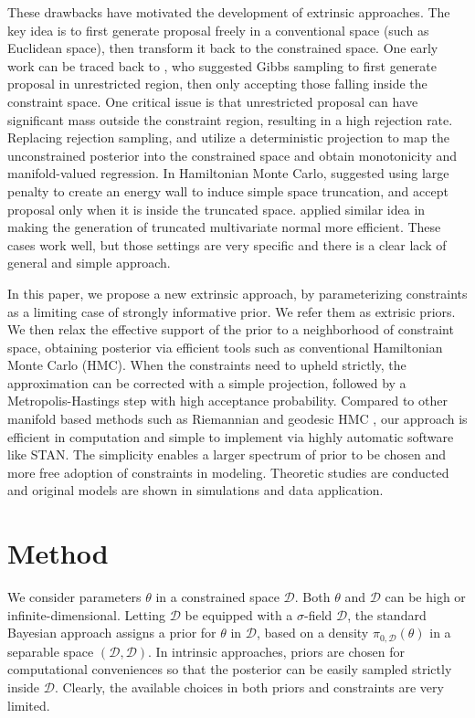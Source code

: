 \documentclass[10pt]{article}
\newcommand{\mc}[1]{\mathcal{#1}}
\DeclareMathOperator{\1}{\mathbbm{1}}
\begin{document}
These drawbacks have motivated the development of extrinsic approaches. The key idea is to first generate proposal freely in a conventional space (such as Euclidean space), then transform it back to the constrained space. One early work can be traced back to \cite{gelfand1992bayesian}, who suggested Gibbs sampling to first generate proposal in unrestricted region, then only accepting those falling inside the constraint space. One critical issue is that unrestricted proposal can have significant mass outside the constraint region, resulting in a high rejection rate. Replacing rejection sampling, \cite{lin2014monogp} and \cite{lin2016extrinsic} utilize a deterministic projection to map the unconstrained posterior into the constrained space and obtain monotonicity and manifold-valued regression. In Hamiltonian Monte Carlo, \cite{neal2011mcmc} suggested using large penalty to create an energy wall to induce simple space truncation, and accept proposal only when it is inside the truncated space. \cite{pakman2014exact} applied similar idea in making the generation of truncated multivariate normal more efficient. These cases work well, but those settings are very specific and there is a clear lack of general and simple approach. 

In this paper, we propose a new extrinsic approach, by parameterizing constraints as a limiting case of strongly informative prior. We refer them as extrisic priors. We then relax the effective support of the prior to a neighborhood of constraint space, obtaining posterior via efficient tools such as conventional Hamiltonian Monte Carlo (HMC). When the constraints need to upheld strictly, the approximation can be corrected with a simple projection, followed by a Metropolis-Hastings step with high acceptance probability. Compared to other manifold based methods such as Riemannian and geodesic HMC \citep{girolami2011riemann,byrne2013geodesic}, our approach is efficient in computation and simple to implement via highly automatic software like STAN. The simplicity enables a larger spectrum of prior to be chosen and more free adoption of constraints in modeling. Theoretic studies are conducted and original models are shown in simulations and data application.

\section{Method}

We consider parameters $\theta$ in a constrained space $\mc D$. Both $\theta$ and $\mc D$ can be high or infinite-dimensional. Letting $\mc D$  be equipped with a $\sigma$-field $\mathscr D$, the standard Bayesian approach assigns a prior for $\theta$ in $\mc D$, based on a density $\pi_{0,\mc D}(\theta)$ in a separable space $(\mc D, \mathscr D)$. In intrinsic approaches, priors are chosen for computational conveniences so that the posterior can be easily sampled strictly inside $\mc D$. Clearly, the available choices in both priors and constraints are very limited.
\end{document}
